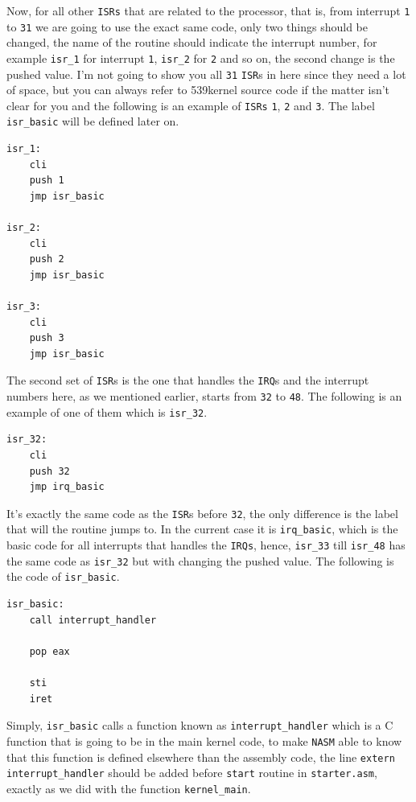 Now, for all other \lstinline!ISRs! that are related to the processor,
that is, from interrupt \lstinline!1! to \lstinline!31! we are going to
use the exact same code, only two things should be changed, the name of
the routine should indicate the interrupt number, for example
\lstinline!isr_1! for interrupt \lstinline!1!, \lstinline!isr_2! for
\lstinline!2! and so on, the second change is the pushed value. I'm not
going to show you all \lstinline!31! \lstinline!ISR!s in here since they
need a lot of space, but you can always refer to 539kernel source code
if the matter isn't clear for you and the following is an example of
\lstinline!ISRs! \lstinline!1!, \lstinline!2! and \lstinline!3!. The
label \lstinline!isr_basic! will be defined later on.

\begin{lstlisting}
isr_1:
    cli
    push 1
    jmp isr_basic
    
isr_2:
    cli
    push 2
    jmp isr_basic
    
isr_3:
    cli
    push 3
    jmp isr_basic
\end{lstlisting}

The second set of \lstinline!ISR!s is the one that handles the
\lstinline!IRQ!s and the interrupt numbers here, as we mentioned
earlier, starts from \lstinline!32! to \lstinline!48!. The following is
an example of one of them which is \lstinline!isr_32!.

\begin{lstlisting}
isr_32:
    cli
    push 32
    jmp irq_basic
\end{lstlisting}

It's exactly the same code as the \lstinline!ISR!s before
\lstinline!32!, the only difference is the label that will the routine
jumps to. In the current case it is \lstinline!irq_basic!, which is the
basic code for all interrupts that handles the \lstinline!IRQs!, hence,
\lstinline!isr_33! till \lstinline!isr_48! has the same code as
\lstinline!isr_32! but with changing the pushed value. The following is
the code of \lstinline!isr_basic!.

\begin{lstlisting}
isr_basic:
    call interrupt_handler
    
    pop eax
    
    sti
    iret
\end{lstlisting}

Simply, \lstinline!isr_basic! calls a function known as
\lstinline!interrupt_handler! which is a C function that is going to be
in the main kernel code, to make \lstinline!NASM! able to know that this
function is defined elsewhere than the assembly code, the line
\lstinline!extern interrupt_handler! should be added before
\lstinline!start! routine in \lstinline!starter.asm!, exactly as we did
with the function \lstinline!kernel_main!.

